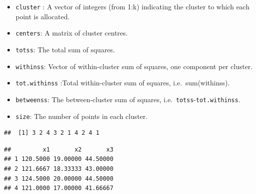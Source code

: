 \documentclass[
]{ctexart}
\newenvironment{Shaded}{\begin{snugshade}}{\end{snugshade}}
\newcommand{\CommentTok}[1]{\textcolor[rgb]{0.56,0.35,0.01}{\textit{#1}}}
\newcommand{\NormalTok}[1]{#1}
\newcommand{\SpecialCharTok}[1]{\textcolor[rgb]{0.81,0.36,0.00}{\textbf{#1}}}
\providecommand{\tightlist}{%
  \setlength{\itemsep}{0pt}\setlength{\parskip}{0pt}}
\begin{document}
\begin{itemize}
\tightlist
\item
  \texttt{cluster} : A vector of integers (from 1:k) indicating the
  cluster to which each point is allocated.
\item
  \texttt{centers}: A matrix of cluster centres.
\item
  \texttt{totss}: The total sum of squares.
\item
  \texttt{withinss}: Vector of within-cluster sum of squares, one
  component per cluster.
\item
  \texttt{tot.withinss} :Total within-cluster sum of squares,
  i.e.~sum(withinss).
\item
  \texttt{betweenss}: The between-cluster sum of squares,
  i.e.~\texttt{totss}-\texttt{tot.withinss}.
\item
  \texttt{size}: The number of points in each cluster.
\end{itemize}

\begin{Shaded}
\end{Shaded}

\begin{verbatim}
##  [1] 3 2 4 3 2 1 4 2 4 1
\end{verbatim}

\begin{Shaded}
\end{Shaded}

\begin{verbatim}
##         x1       x2       x3
## 1 120.5000 19.00000 44.50000
## 2 121.6667 18.33333 43.00000
## 3 124.5000 20.00000 44.50000
## 4 121.0000 17.00000 41.66667
\end{verbatim}

\begin{Shaded}
\end{Shaded}
\end{document}

